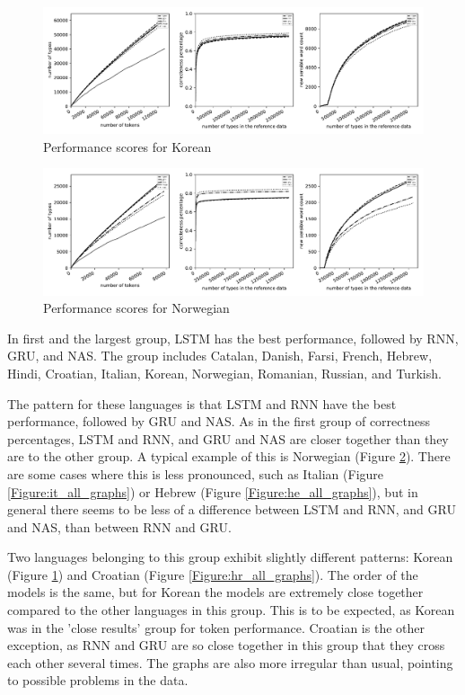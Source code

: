 \documentclass[11pt,a4paper,twoside,openright]{scrbook}
\begin{document}
\begin{figure}
\centering
\includegraphics[width=\textwidth]{graphs/ko_all_graphs}
\caption{Performance scores for Korean}
\label{Figure:ko_all_graphs}
\end{figure}

\begin{figure}
\centering
\includegraphics[width=\textwidth]{graphs/no_all_graphs}
\caption{Performance scores for Norwegian}
\label{Figure:no_all_graphs}
\end{figure}

In first and the largest group,  LSTM has the best performance, followed by RNN, GRU, and NAS. The group includes Catalan, Danish, Farsi, French, Hebrew, Hindi, Croatian, Italian, Korean, Norwegian, Romanian, Russian, and Turkish. 

The pattern for these languages is that LSTM and RNN have the best performance, followed by GRU and NAS. As in the first group of correctness percentages, LSTM and RNN, and GRU and NAS are closer together than they are to the other group. A typical example of this is Norwegian (Figure \ref{Figure:no_all_graphs}). There are some cases where this is less pronounced, such as Italian (Figure \ref{Figure:it_all_graphs}) or Hebrew (Figure \ref{Figure:he_all_graphs}), but in general there seems to be less of a difference between LSTM and RNN, and GRU and NAS, than between RNN and GRU. 

Two languages belonging to this group exhibit slightly different patterns: Korean (Figure \ref{Figure:ko_all_graphs}) and Croatian (Figure \ref{Figure:hr_all_graphs}). The order of the models is the same, but for Korean the models are extremely close together compared to the other languages in this group. This is to be expected, as Korean was in the 'close results' group  for token performance. Croatian is the other exception, as RNN and GRU are so close together in this group that they cross each other several times. The graphs are also more irregular than usual, pointing to possible problems in the data. 
\end{document}
